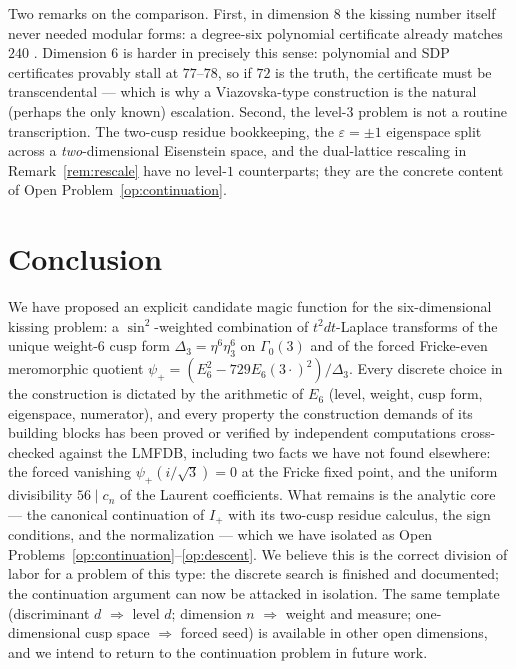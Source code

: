 \documentclass[11pt,reqno]{amsart}
\theoremstyle{plain}
\theoremstyle{definition}
\theoremstyle{remark}
\newcommand{\eps}{\varepsilon}
\newcommand{\Dthree}{\Delta_{3}}
\newcommand{\psip}{\psi_{+}}
\newcommand{\Ip}{I_{+}}
\begin{document}
Two remarks on the comparison.  First, in dimension $8$ the kissing
number itself never needed modular forms: a degree-six polynomial
certificate already matches $240$
\cite{Levenshtein1979,OdlyzkoSloane1979}.  Dimension $6$ is harder in
precisely this sense: polynomial and SDP certificates provably stall
at $77$--$78$, so if $72$ is the truth, the certificate must be
transcendental --- which is why a Viazovska-type construction is the
natural (perhaps the only known) escalation.  Second, the level-$3$
problem is not a routine transcription.  The two-cusp residue
bookkeeping, the $\eps=\pm1$ eigenspace split across a
\emph{two}-dimensional Eisenstein space, and the dual-lattice
rescaling in Remark~\ref{rem:rescale} have no level-$1$ counterparts;
they are the concrete content of
Open Problem~\ref{op:continuation}.

\section{Conclusion}\label{sec:conclusion}

We have proposed an explicit candidate magic function for the
six-dimensional kissing problem: a $\sin^2$-weighted combination of
$t^2dt$-Laplace transforms of the unique weight-$6$ cusp form
$\Dthree=\eta^6\eta_3^6$ on $\Gamma_0(3)$ and of the forced
Fricke-even meromorphic quotient
$\psip=(E_6^2-729E_6(3\cdot)^2)/\Dthree$.  Every discrete choice in
the construction is dictated by the arithmetic of $E_6$ (level,
weight, cusp form, eigenspace, numerator), and every property the
construction demands of its building blocks has been proved or
verified by independent computations cross-checked against the LMFDB,
including two facts we have not found elsewhere: the forced vanishing
$\psip(i/\sqrt3)=0$ at the Fricke fixed point, and the uniform
divisibility $56\mid c_n$ of the Laurent coefficients.  What remains
is the analytic core --- the canonical continuation of $\Ip$ with its
two-cusp residue calculus, the sign conditions, and the
normalization --- which we have isolated as
Open Problems~\ref{op:continuation}--\ref{op:descent}.  We believe
this is the correct division of labor for a problem of this type: the
discrete search is finished and documented; the continuation argument
can now be attacked in isolation.  The same template (discriminant
$d$ $\Rightarrow$ level $d$; dimension $n$ $\Rightarrow$ weight and
measure; one-dimensional cusp space $\Rightarrow$ forced seed) is
available in other open dimensions, and we intend to return to the
continuation problem in future work.
\end{document}
